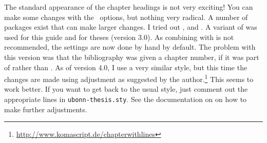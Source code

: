 The standard appearance of the chapter headings is not very exciting!
You can make some changes with the \KOMAScript\ options, but nothing
very radical.
A number of packages exist that can make larger changes. 
I tried out ,  and .
A variant of  was used for this guide and for theses (version 3.0).
As combining  with \KOMAScript{} is not recommended,
the settings are now done by hand by default.
The problem with this version was that the bibliography was given a chapter number,
if it was part of  rather than .
As of version 4.0, I use a very similar style,
but this time the changes are made using \KOMAScript{} adjustment as suggested by the author.\footnote{%
\url{http://www.komascript.de/chapterwithlines}}
This seems to work better.
If you want to get back to the
usual style, just comment out the appropriate lines in
\texttt{ubonn-thesis.sty}. See the documentation on
 on how to make further adjustments.

